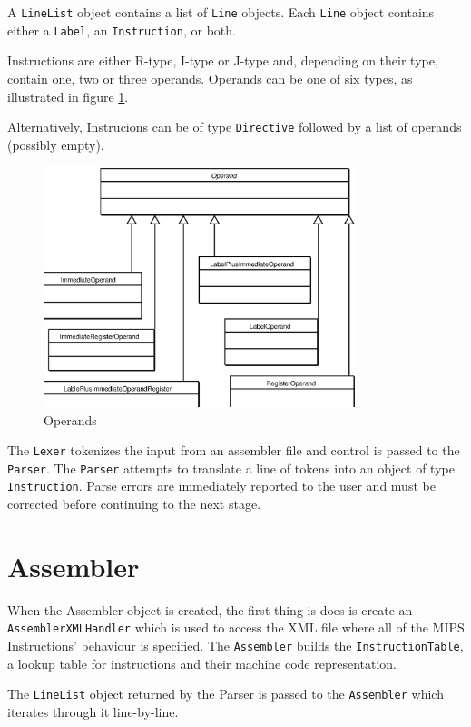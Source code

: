 A {\tt LineList} object contains a list of {\tt Line} objects. Each {\tt Line} object contains either a {\tt Label}, an {\tt Instruction}, or both. 

Instructions are either R-type, I-type or J-type and, depending on their type, contain one, two or three operands. Operands can be one of six types, as illustrated in figure \ref{figOperands}.

Alternatively, Instrucions can be of type {\tt Directive} followed by a list of operands (possibly empty).

\begin{figure}[htbp]
\begin{center}
\includegraphics[height=7cm]{operands.eps}
\end{center}
\caption{Operands}
\label{figOperands}
\end{figure}

The {\tt Lexer} tokenizes the input from an assembler file and control is passed to the {\tt Parser}. The {\tt Parser} attempts to translate a line of tokens into an object of type {\tt Instruction}. Parse errors are immediately reported to the user and must be corrected before continuing to the next stage.

\section{Assembler}

When the Assembler object is created, the first thing is does is create an {\tt AssemblerXMLHandler} which is used to access the XML file where all of the MIPS Instructions' behaviour is specified. The {\tt Assembler} builds the {\tt InstructionTable}, a lookup table for instructions and their machine code representation.

The {\tt LineList} object returned by the Parser is passed to the {\tt Assembler} which iterates through it line-by-line.

